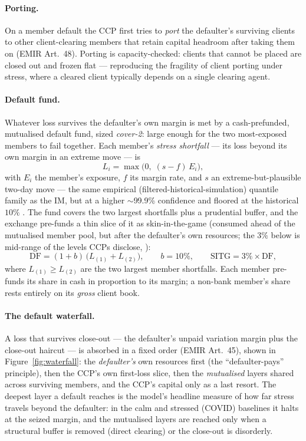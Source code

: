 \paragraph{Porting.}
On a member default the CCP first tries to \emph{port} the defaulter's surviving clients to other
client-clearing members that retain capital headroom after taking them on (EMIR Art.~48). Porting is
capacity-checked: clients that cannot be placed are closed out and frozen flat --- reproducing the
fragility of client porting under stress, where a cleared client typically depends on a single
clearing agent.

\paragraph{Default fund.}
Whatever loss survives the defaulter's own margin is met by a cash-prefunded, mutualised default
fund, sized \emph{cover-2}: large enough for the two most-exposed members to fail together. Each
member's \emph{stress shortfall} --- its loss beyond its own margin in an extreme move --- is
\begin{equation}
\label{eq:sloim}
L_i = \max\!\bigl(0,\; (s - f)\,E_i\bigr),
\end{equation}
with $E_i$ the member's exposure, $f$ its margin rate, and $s$ an extreme-but-plausible two-day move
--- the same empirical (filtered-historical-simulation) quantile family as the IM, but at a higher
$\sim$99.9\% confidence and floored at the historical $10\%$ \citep{euronext_a9}. The fund covers the two largest
shortfalls plus a prudential buffer, and the exchange pre-funds a thin slice of it as
skin-in-the-game (consumed ahead of the mutualised member pool, but after the defaulter's own
resources; the $3\%$ below is mid-range of the levels CCPs disclose, \citealp{cpmi_iosco_pqd}):
\begin{equation}
\label{eq:df}
\mathrm{DF} = (1+b)\,\bigl(L_{(1)} + L_{(2)}\bigr), \qquad b = 10\%, \qquad
\mathrm{SITG} = 3\%\times\mathrm{DF},
\end{equation}
where $L_{(1)} \ge L_{(2)}$ are the two largest member shortfalls. Each member pre-funds its share in
cash in proportion to its margin; a non-bank member's share rests entirely on its \emph{gross} client
book.

\paragraph{The default waterfall.}
A loss that survives close-out --- the defaulter's unpaid variation margin plus the close-out haircut
--- is absorbed in a fixed order (EMIR Art.~45), shown in Figure~\ref{fig:waterfall}: the
\emph{defaulter's} own resources first (the ``defaulter-pays'' principle), then the CCP's own
first-loss slice, then the \emph{mutualised} layers shared across surviving members, and the CCP's
capital only as a last resort. The deepest layer a default reaches is the model's headline measure of
how far stress travels beyond the defaulter: in the calm and stressed (COVID) baselines it halts at
the seized margin, and the mutualised layers are reached only when a structural buffer is removed
(direct clearing) or the close-out is disorderly.

